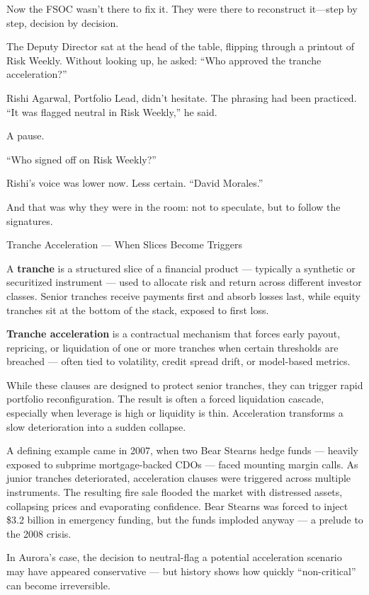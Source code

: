 Now the FSOC wasn’t there to fix it.
They were there to reconstruct it—step by step, decision by decision.

The Deputy Director sat at the head of the table, flipping through a printout of Risk Weekly.
Without looking up, he asked:
“Who approved the tranche acceleration?”

Rishi Agarwal, Portfolio Lead, didn’t hesitate. The phrasing had been practiced.
“It was flagged neutral in Risk Weekly,” he said.

A pause.

“Who signed off on Risk Weekly?”

Rishi’s voice was lower now. Less certain.
“David Morales.”

And that was why they were in the room: not to speculate, but to follow the signatures.

\medskip

\begin{TechnicalSidebar}{Tranche Acceleration — When Slices Become Triggers}

  A \textbf{tranche} is a structured slice of a financial product — typically a synthetic or securitized 
  instrument — used to allocate risk and return across different investor classes. Senior tranches receive 
  payments first and absorb losses last, while equity tranches sit at the bottom of the stack, exposed to 
  first loss.

  \medskip

  \textbf{Tranche acceleration} is a contractual mechanism that forces early payout, repricing, or 
  liquidation of one or more tranches when certain thresholds are breached — often tied to volatility, credit 
  spread drift, or model-based metrics.

  \medskip
  
  While these clauses are designed to protect senior tranches, they can trigger rapid portfolio reconfiguration. 
  The result is often a forced liquidation cascade, especially when leverage is high or liquidity is thin. 
  Acceleration transforms a slow deterioration into a sudden collapse.

  \medskip
  
  A defining example came in 2007, when two Bear Stearns hedge funds — heavily exposed to subprime mortgage-backed 
  CDOs — faced mounting margin calls. As junior tranches deteriorated, acceleration clauses were triggered across 
  multiple instruments. The resulting fire sale flooded the market with distressed assets, collapsing prices and 
  evaporating confidence. Bear Stearns was forced to inject \$3.2 billion in emergency funding, but the funds 
  imploded anyway — a prelude to the 2008 crisis.

  \medskip
  
  In Aurora’s case, the decision to neutral-flag a potential acceleration scenario may have appeared conservative 
  — but history shows how quickly “non-critical” can become irreversible.
  
\end{TechnicalSidebar}

